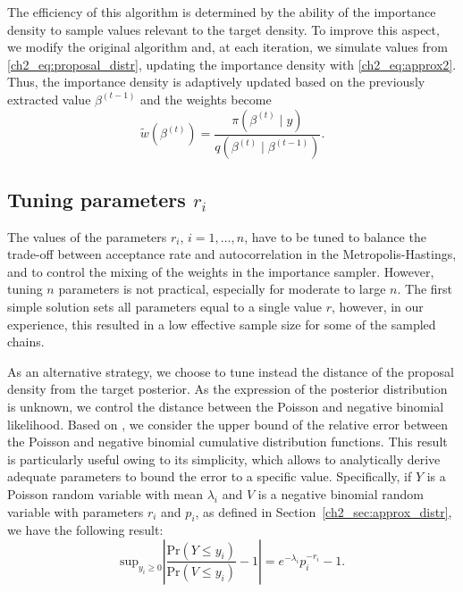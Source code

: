 The efficiency of this algorithm is determined by the ability of the importance density to sample values relevant to the target density.
To improve this aspect, we modify the original algorithm and, at each iteration, we simulate values from \eqref{ch2_eq:proposal_distr}, updating the importance density with \eqref{ch2_eq:approx2}. Thus, the importance density is adaptively updated based on the previously extracted value $\beta^{(t-1)}$ and the weights become
\begin{equation*}
\tilde{w}(\beta^{(t)}) = \frac{\pi(\beta^{(t)} \mid y)}{q(\beta^{(t)} \mid \beta^{(t-1)})}.
\end{equation*}


\subsection{Tuning parameters $r_i$}
\label{sec:tuning_param}

The values of the parameters $r_i$, $i=1,\dots,n$, have to be tuned to balance the trade-off between acceptance rate and autocorrelation in the Metropolis-Hastings, and to control the mixing of the weights in the importance sampler. However, tuning $n$ parameters is not practical, especially for moderate to large $n$.
The first simple solution sets all  parameters equal to a single value $r$, however, in our experience, this resulted in a low effective sample size for some of the sampled chains.

As an alternative strategy, we choose to tune instead the distance of the proposal density from the target posterior.
As the expression of the posterior distribution is unknown, we control the distance between the Poisson and negative binomial likelihood. %
Based on \textcite{Teerapabolarn2012}, we consider the upper bound of the relative error between the Poisson and negative binomial cumulative distribution functions. This result is particularly useful owing to its simplicity, which allows to analytically derive adequate parameters to bound the error to a specific value. Specifically, if $Y$ is a Poisson random variable with mean $\lambda_i$ and $V$ is a negative binomial random variable with parameters $r_i$ and $p_i$, as defined in Section~\ref{ch2_sec:approx_distr}, we have the following result:
\begin{equation*}
\mathrm{sup}_{y_i\geq 0} \left\lvert \frac{\mbox{Pr}(Y\leq y_i)}{\mbox{Pr}(V\leq y_i)} -1 \right\rvert = e^{-\lambda_i} p_i^{-r_i} - 1.
\end{equation*}

